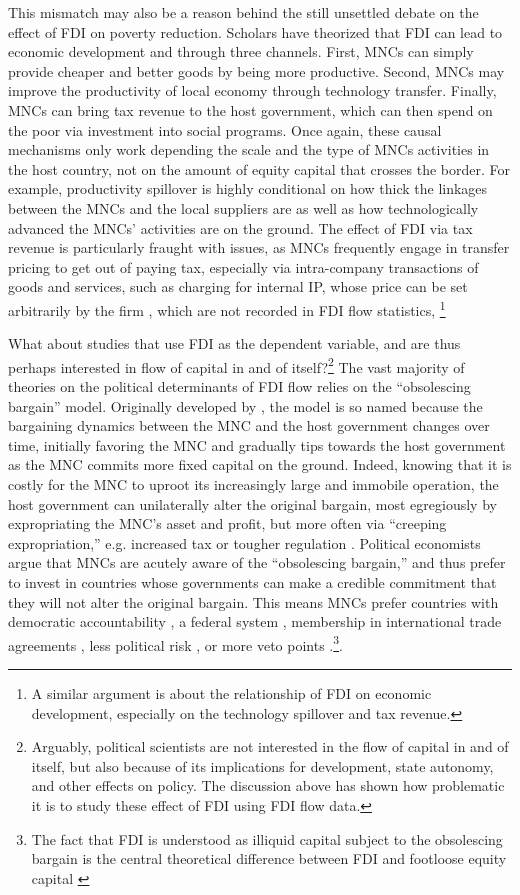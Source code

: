 This mismatch may also be a reason behind the still unsettled debate on the
effect of FDI on poverty reduction. Scholars have theorized that FDI can lead to
economic development and through three channels. First, MNCs can simply provide
cheaper and better goods by being more productive. Second, MNCs may improve the
productivity of local economy through technology transfer. Finally, MNCs can
bring tax revenue to the host government, which can then spend on the poor via
investment into social programs. Once again, these causal mechanisms only work
depending the scale and the type of MNCs activities in the host country, not on
the amount of equity capital that crosses the border. For example, productivity
spillover is highly conditional on how thick the linkages between the MNCs and
the local suppliers are as well as how technologically advanced the MNCs'
activities are on the ground. The effect of FDI via tax revenue is particularly
fraught with issues, as MNCs frequently engage in transfer pricing to get out of
paying tax, especially via intra-company transactions of goods and services,
such as charging for internal IP, whose price can be set arbitrarily by the firm
\citep{Malesky2015c}, which are not recorded in FDI flow statistics, \footnote{A
similar argument is about the relationship of FDI on economic development,
especially on the technology spillover and tax revenue.}

What about studies that use FDI as the dependent variable, and are thus perhaps
interested in flow of capital in and of itself?\footnote{Arguably, political
scientists are not interested in the flow of capital in and of itself, but also
because of its implications for development, state autonomy, and other effects
on policy. The discussion above has shown how problematic it is to study these
effect of FDI using FDI flow data.} The vast majority of theories on the
political determinants of FDI flow relies on the ``obsolescing bargain'' model.
Originally developed by \citet{Vernon1971}, the model is so named because the
bargaining dynamics between the MNC and the host government changes over time,
initially favoring the MNC and gradually tips towards the host government as the
MNC commits more fixed capital on the ground. Indeed, knowing that it is costly
for the MNC to uproot its increasingly large and immobile operation, the host
government can unilaterally alter the original bargain, most egregiously by
expropriating the MNC's asset and profit, but more often via ``creeping
expropriation,'' e.g. increased tax or tougher regulation \citep{Li2009a}.
Political economists argue that MNCs are acutely aware of the ``obsolescing
bargain,'' and thus prefer to invest in countries whose governments can make a
credible commitment that they will not alter the original bargain. This means
MNCs prefer countries with democratic accountability \citep{Jensen2003}, a
federal system \citep{Jensen2005}, membership in international trade agreements
\citep{Buthe2008}, less political risk \citep{Beazer2011, Graham2010}, or more
veto points \citep{Choi2008}.\footnote{The fact that FDI is understood as
illiquid capital subject to the obsolescing bargain is the central theoretical
difference between FDI and footloose equity capital \citep{Ahlquist2006,
David2008}}.

